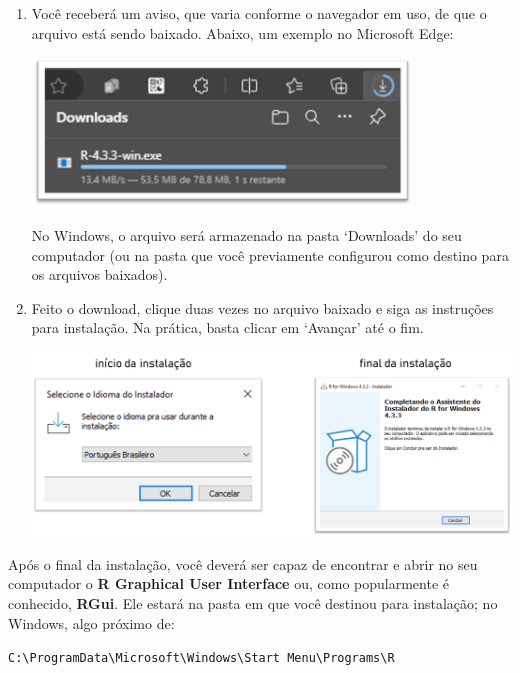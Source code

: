 \documentclass[
  letterpaper,
  DIV=11,
  numbers=noendperiod]{scrreprt}
\begin{document}
\begin{enumerate}
\def\labelenumi{\arabic{enumi}.}
\setcounter{enumi}{5}
\item
  Você receberá um aviso, que varia conforme o navegador em uso, de que
  o arquivo está sendo baixado. Abaixo, um exemplo no Microsoft Edge:

  \begin{center}
  \includegraphics[width=3.96875in,height=\textheight]{images/clipboard-2313357345.png}
  \end{center}

  No Windows, o arquivo será armazenado na pasta `Downloads' do seu
  computador (ou na pasta que você previamente configurou como destino
  para os arquivos baixados).
\item
  Feito o download, clique duas vezes no arquivo baixado e siga as
  instruções para instalação. Na prática, basta clicar em `Avançar' até
  o fim.

  \begin{center}
  \includegraphics{images/clipboard-1694765597.png}
  \end{center}
\end{enumerate}

Após o final da instalação, você deverá ser capaz de encontrar e abrir
no seu computador o \textbf{R Graphical User Interface} ou, como
popularmente é conhecido, \textbf{RGui}. Ele estará na pasta em que você
destinou para instalação; no Windows, algo próximo de:

\texttt{C:\textbackslash{}ProgramData\textbackslash{}Microsoft\textbackslash{}Windows\textbackslash{}Start\ Menu\textbackslash{}Programs\textbackslash{}R}
\end{document}
